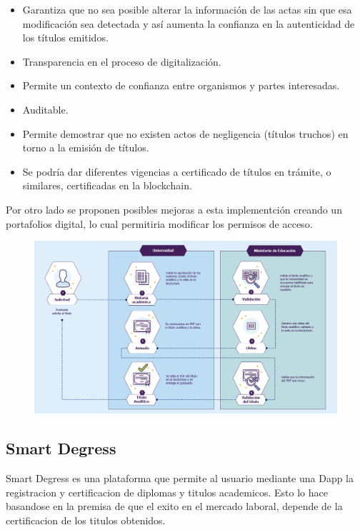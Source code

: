 \documentclass[11pt,a4paper]{article}
\begin{document}
        \begin{itemize}
            \item Garantiza que no sea posible alterar la 
            información de las actas sin que esa modificación sea detectada y así aumenta la confianza en la autenticidad de los títulos emitidos. 
            \item Transparencia en el proceso de digitalización.
            \item Permite un contexto de confianza entre organismos y partes interesadas. 
            \item Auditable.
            \item Permite demostrar que no existen actos de negligencia (títulos truchos) en torno a la emisión de títulos.
            \item Se podría dar diferentes vigencias a certificado de títulos en trámite, o similares, certificadas en la blockchain.
        \end{itemize}

        Por otro lado se proponen posibles mejoras a esta implementción creando un portafolios digital, lo cual 
        permitiria modificar los permisos de acceso.

        \begin{figure}
            \centering
            \includegraphics[width=\textwidth]{Img/cuadro_problematica.png}
            \caption{}
            \label{fig:cuadro_problematica}
        \end{figure}

        \subsection{Smart Degress}
        
        Smart Degress es una plataforma que permite al usuario mediante una Dapp la registracion y
        certificacion de diplomas y titulos academicos. Esto lo hace basandose en la premisa de que el 
        exito en el mercado laboral, depende de la certificacion de los titulos obtenidos.
\end{document}
